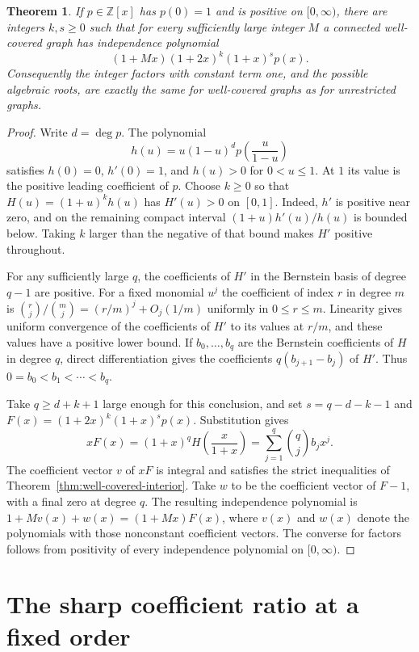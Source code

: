 \documentclass[11pt,a4paper]{article}
\newtheorem{theorem}{Theorem}[section]
\begin{document}
\begin{theorem}\label{thm:well-covered-factors}
If $p\in\mathbb Z[x]$ has $p(0)=1$ and is positive on $[0,\infty)$,
there are integers $k,s\ge0$ such that for every sufficiently large
integer $M$ a connected well-covered graph has independence polynomial
\[
 (1+Mx)(1+2x)^k(1+x)^s p(x).
\]
Consequently the integer factors with constant term one, and the possible
algebraic roots, are exactly the same for well-covered graphs as for
unrestricted graphs.
\end{theorem}
\begin{proof}
Write $d=\deg p$. The polynomial
\[
 h(u)=u(1-u)^d p\!\left(\frac{u}{1-u}\right)
\]
satisfies $h(0)=0$, $h'(0)=1$, and $h(u)>0$ for $0<u\le1$.
At $1$ its value is the positive leading coefficient of $p$. Choose
$k\ge0$ so that $H(u)=(1+u)^k h(u)$ has $H'(u)>0$ on $[0,1]$.
Indeed, $h'$ is positive near zero, and on the remaining compact
interval $(1+u)h'(u)/h(u)$ is bounded below. Taking $k$ larger than
the negative of that bound makes $H'$ positive throughout.

For any sufficiently large $q$, the coefficients of $H'$ in the
Bernstein basis of degree $q-1$ are positive. For a fixed monomial
$u^j$ the coefficient of index $r$ in degree $m$ is
$\binom rj/\binom mj=(r/m)^j+O_j(1/m)$ uniformly in $0\le r\le m$.
Linearity gives uniform convergence of the coefficients of $H'$ to its
values at $r/m$, and these values have a positive lower bound. If
$b_0,\ldots,b_q$ are the Bernstein coefficients of $H$ in degree $q$,
direct differentiation gives the coefficients $q(b_{j+1}-b_j)$ of
$H'$. Thus $0=b_0<b_1<\cdots<b_q$.

Take $q\ge d+k+1$ large enough for this conclusion, and set
$s=q-d-k-1$ and $F(x)=(1+2x)^k(1+x)^s p(x)$. Substitution gives
\[
 xF(x)=(1+x)^q H\!\left(\frac{x}{1+x}\right)
      =\sum_{j=1}^q \binom qj b_j x^j.
\]
The coefficient vector $v$ of $xF$ is integral and satisfies the strict
inequalities of Theorem~\ref{thm:well-covered-interior}. Take $w$ to
be the coefficient vector of $F-1$, with a final zero at degree $q$.
The resulting independence polynomial is $1+Mv(x)+w(x)=(1+Mx)F(x)$,
where $v(x)$ and $w(x)$ denote the polynomials with those nonconstant
coefficient vectors. The converse for factors follows from positivity
of every independence polynomial on $[0,\infty)$.
\end{proof}

\section{The sharp coefficient ratio at a fixed order}
\label{sec:exact-ratio}
\end{document}
